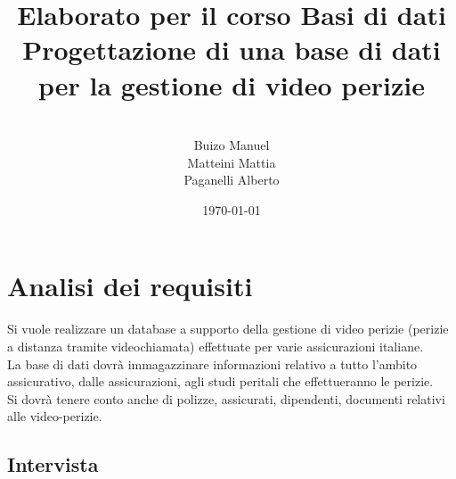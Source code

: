 \documentclass[a4paper,12pt]{report}
\title{\textbf{Elaborato per il corso Basi di dati}
Progettazione di una base di dati per la gestione di video perizie}
\author{
\\Buizo Manuel
\\Matteini Mattia
\\Paganelli Alberto
}
\date{\today}
\begin{document}
\maketitle

\tableofcontents

\chapter{Analisi dei requisiti}

Si vuole realizzare un database a supporto della gestione di video perizie (perizie a distanza tramite videochiamata) effettuate per varie assicurazioni italiane.
\\
La base di dati dovrà immagazzinare informazioni relativo a tutto l’ambito assicurativo, dalle assicurazioni, agli studi peritali che effettueranno le perizie.
\\
Si dovrà tenere conto anche di polizze, assicurati, dipendenti, documenti relativi alle video-perizie.


\section{Intervista }
\end{document}
